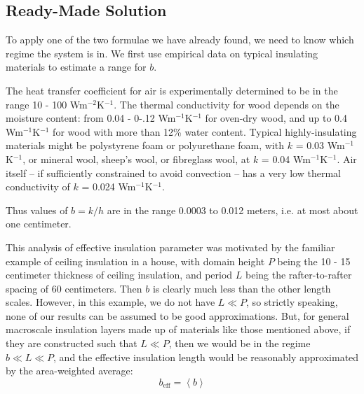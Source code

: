 \documentclass[12pt, a4paper, twoside, openright]{book}
\newcommand{\beff}{\ensuremath{b_{\mathrm{eff}}}}
\begin{document}
\subsection{Ready-Made Solution}

To apply one of the two formulae we have already found, we need to know which regime the system is in.  We first use empirical data on typical insulating materials to estimate a range for $b$. 



The heat transfer coefficient for air is experimentally determined to be in the range 10 - 100 Wm$^{-2}$K$^{-1}$.
The thermal conductivity for wood depends on the moisture content: from 0.04 - 0-.12 Wm$^{-1}$K$^{-1}$ for oven-dry wood, and up to 0.4 Wm$^{-1}$K$^{-1}$ for wood with more than 12\% water content.
Typical highly-insulating materials might be polystyrene foam or polyurethane foam, with $k$ = 0.03 Wm$^{-1}$K$^{-1}$, or mineral wool, sheep's wool, or fibreglass wool, at $k$ = 0.04 Wm$^{-1}$K$^{-1}$.
Air itself -- if sufficiently constrained to avoid convection -- has a very low thermal conductivity of $k$ = 0.024 Wm$^{-1}$K$^{-1}$.

Thus values of $b = k/h$ are in the range 0.0003 to 0.012 meters, i.e. at most about one centimeter.

This analysis of effective insulation parameter was motivated by the familiar example of ceiling insulation in a house, with domain height $P$ being the 10 - 15 centimeter thickness of ceiling insulation, and period $L$ being the rafter-to-rafter spacing of 60 centimeters.  Then $b$ is clearly much less than the other length scales.  However, in this example, we do not have $L \ll P$, so strictly speaking, none of our results can be assumed to be good approximations.  But, for general macroscale insulation layers made up of materials like those mentioned above, if they are constructed such that $L \ll P$, then we would be in the regime $b \ll L \ll P$, and the effective insulation length would be reasonably approximated by the area-weighted average:
\begin{equation}
\beff = \left< b \right>
\label{eq:effins}
\end{equation}
\end{document}
